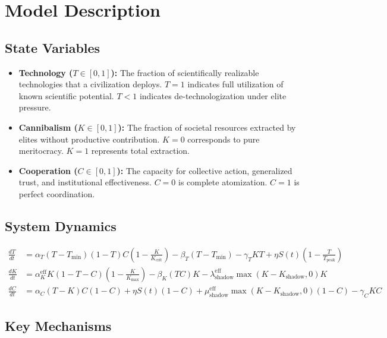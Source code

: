 \section{Model Description}

\subsection{State Variables}

\begin{itemize}
    \item \textbf{Technology ($T \in [0,1]$):} The fraction of scientifically realizable technologies that a civilization deploys. $T=1$ indicates full utilization of known scientific potential. $T<1$ indicates de-technologization under elite pressure.
    \item \textbf{Cannibalism ($K \in [0,1]$):} The fraction of societal resources extracted by elites without productive contribution. $K=0$ corresponds to pure meritocracy. $K=1$ represents total extraction.
    \item \textbf{Cooperation ($C \in [0,1]$):} The capacity for collective action, generalized trust, and institutional effectiveness. $C=0$ is complete atomization. $C=1$ is perfect coordination.
\end{itemize}

\subsection{System Dynamics}

\begin{align}
\frac{dT}{dt} &= \alpha_T (T - T_{\min})(1 - T) C \left(1 - \frac{K}{K_{\text{crit}}}\right)
               - \beta_T (T - T_{\min})
               - \gamma_T K T
               + \eta S(t) \left(1 - \frac{T}{T_{\text{peak}}}\right) \label{eq:dT} \\[4pt]
\frac{dK}{dt} &= \alpha_K^{\text{eff}} K (1 - T - C) \left(1 - \frac{K}{K_{\max}}\right)
               - \beta_K (T C) K
               - \lambda_{\text{shadow}}^{\text{eff}} \max(K - K_{\text{shadow}}, 0) K \label{eq:dK} \\[4pt]
\frac{dC}{dt} &= \alpha_C (T - K) C (1 - C)
               + \eta S(t) (1 - C)
               + \mu_{\text{shadow}}^{\text{eff}} \max(K - K_{\text{shadow}}, 0) (1 - C)
               - \gamma_C K C \label{eq:dC}
\end{align}

\subsection{Key Mechanisms}

